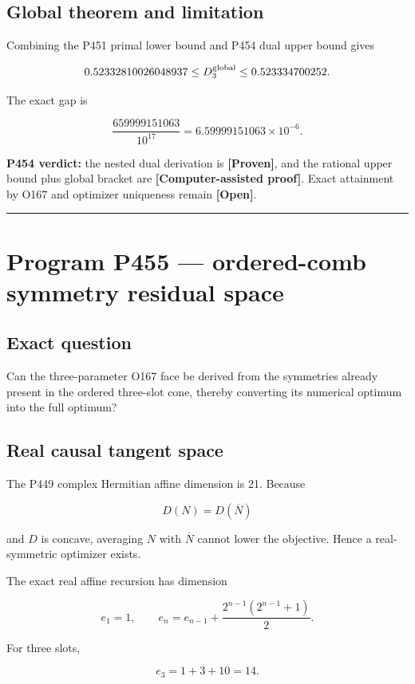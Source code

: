 \documentclass[11pt,a4paper,openany]{report}
\newcommand{\statusProven}{\textcolor{fingreen}{[Proven]}}
\begin{document}
\section{Global theorem and limitation}

Combining the P451 primal lower bound and P454 dual upper bound gives

\[
0.52332810026048937
\le D_3^{\rm global}
\le0.523334700252.
\]

The exact gap is

\[
\frac{659999151063}{10^{17}}
=6.59999151063\times10^{-6}.
\]

\textbf{P454 verdict:} the nested dual derivation is \textbf{\statusProven{}}, and the rational upper bound plus global bracket are \textbf{\textcolor{fingreen}{[Computer-assisted proof]}}. Exact attainment by O167 and optimizer uniqueness remain \textbf{\textcolor{finorange}{[Open]}}.

\par\medskip\hrule\medskip

\chapter{Program P455 --- ordered-comb symmetry residual space}

\section{Exact question}

Can the three-parameter O167 face be derived from the symmetries already present in the ordered three-slot cone, thereby converting its numerical optimum into the full optimum?

\section{Real causal tangent space}

The P449 complex Hermitian affine dimension is 21. Because

\[
D(N)=D(\overline N)
\]

and \(D\) is concave, averaging \(N\) with \(\overline N\) cannot lower the objective. Hence a real-symmetric optimizer exists.

The exact real affine recursion has dimension

\[
e_1=1,
\qquad e_n=e_{n-1}+\frac{2^{n-1}(2^{n-1}+1)}{2}.
\]

For three slots,

\[
e_3=1+3+10=14.
\]
\end{document}
